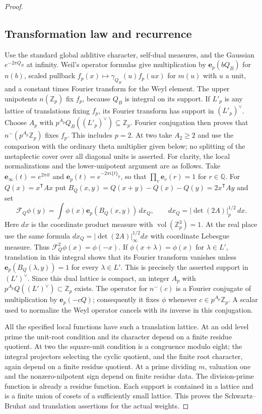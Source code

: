\begin{proof}
\subsection{Transformation law and recurrence}
Use the standard global additive character, self-dual measures,
and the Gaussian $e^{-2\pi Q_B}$ at infinity.  Weil's operator
formulas \cite[I.13]{weil} give multiplication by $\mathbf e_p(bQ_B)$ for
$n(b)$, scaled pullback $f_p(x)\mapsto\gamma_{Q_B}(u)f_p(ux)$ for
$m(u)$ with $u$ a unit, and a constant times Fourier transform
for the Weyl element.  The upper unipotents $n(\mathbb Z_p)$ fix
$f_p$, because $Q_B$ is integral on its support.  If $L'_p$ is any
lattice of translations fixing $f_p$, its Fourier transform has
support in $(L'_p)^\vee$.  Choose $A_p$ with
$p^{A_p}Q_B((L'_p)^\vee)\subseteq\mathbb Z_p$.  Fourier conjugation
then proves that $n^-(p^{A_p}\mathbb Z_p)$ fixes $f_p$.
This includes $p=2$. At two take $A_2\ge2$ and use the comparison
with the ordinary theta multiplier given below; no splitting of
the metaplectic cover over all diagonal units is asserted.
For clarity, the local normalizations and the lower-unipotent
argument are as follows. Take
$\mathbf e_\infty(t)=e^{2\pi it}$ and
$\mathbf e_p(t)=e^{-2\pi i\{t\}_p}$, so that
$\prod_v\mathbf e_v(r)=1$ for $r\in\mathbb Q$.
For $Q(x)=x^{\mathsf T}Ax$ put
$B_Q(x,y)=Q(x+y)-Q(x)-Q(y)=2x^{\mathsf T}Ay$ and set
\[
 \mathcal F_Q\phi(y)=\int\phi(x)\mathbf e_p(B_Q(x,y))\,dx_Q,
 \qquad dx_Q=|\det(2A)|_p^{1/2}\,dx.
\]
Here $dx$ is the coordinate product measure with
$\operatorname{vol}(\mathbb Z_p^3)=1$.
At the real place use the same formula
$dx_Q=|\det(2A)|_\infty^{1/2}dx$ with coordinate Lebesgue measure.
Thus $\mathcal F_Q^2\phi(x)=\phi(-x)$.
If $\phi(x+\lambda)=\phi(x)$ for $\lambda\in L'$, translation
in this integral shows that its Fourier transform vanishes unless
$\mathbf e_p(B_Q(\lambda,y))=1$ for every $\lambda\in L'$.
This is precisely the asserted support in $(L')^\vee$.
Since this dual lattice is compact, an integer $A_p$ with
$p^{A_p}Q((L')^\vee)\subset\mathbb Z_p$ exists. The operator
for $n^-(c)$ is a Fourier conjugate of multiplication by
$\mathbf e_p(-cQ)$; consequently it fixes $\phi$ whenever
$c\in p^{A_p}\mathbb Z_p$. A scalar used to normalize the Weyl
operator cancels with its inverse in this conjugation.

All the specified local functions have such a translation lattice.
At an odd level prime the unit-root condition and its character
depend on a finite residue quotient. At two the square-unit
condition is a congruence modulo eight; the integral projectors
selecting the cyclic quotient, and the finite root character,
again depend on a finite residue quotient. At a prime dividing
$m$, valuation one and the nonzero-nilpotent sign depend on finite
residue data. The division-prime function is already a residue
function. Each support is contained in a lattice and is a finite
union of cosets of a sufficiently small lattice. This proves the
Schwartz--Bruhat and translation assertions for the actual weights.


\end{proof}
